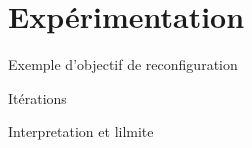 \section{Expérimentation}
\begin{frame}{Exemple d'objectif de reconfiguration}
    
\end{frame}

\begin{frame}{Itérations}
    
\end{frame}

\begin{frame}{Interpretation et lilmite}
\end{frame}
